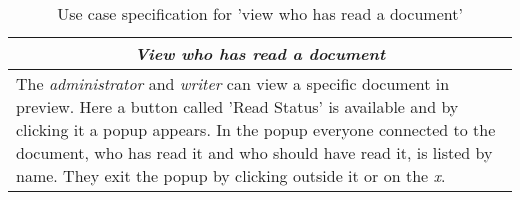 \begin{table}[H]
\centering
\begin{tabular}{p{14.5cm}}
\hline
\multicolumn{1}{c}{\textit{\textbf{View who has read a document}}} \\
\hline
The \textit{administrator} and \textit{writer} can view a specific document in preview.
Here a button called 'Read Status' is available and by clicking it a popup appears.
In the popup everyone connected to the document, who has read it and who should have read it, is listed by name.
They exit the popup by clicking outside it or on the \textit{x}.
\\\hline
\end{tabular}
\caption{Use case specification for 'view who has read a document'}\label{tab:read-status}
\end{table}
